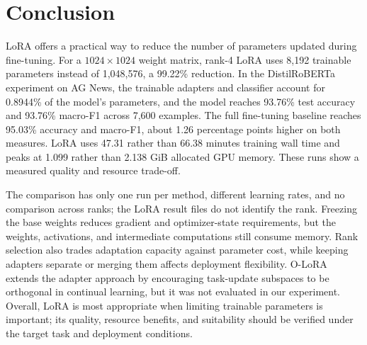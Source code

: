 \section{Conclusion}
LoRA offers a practical way to reduce the number of parameters updated
during fine-tuning. For a $1024 \times 1024$ weight matrix, rank-4 LoRA
uses 8,192 trainable parameters instead of 1,048,576, a 99.22\%
reduction. In the DistilRoBERTa experiment on AG News, the
trainable adapters and classifier account for 0.8944\% of the model's
parameters, and the model reaches 93.76\% test accuracy and 93.76\%
macro-F1 across 7,600 examples. The full fine-tuning baseline reaches
95.03\% accuracy and macro-F1, about 1.26 percentage points higher on
both measures. LoRA uses 47.31 rather than 66.38 minutes training wall
time and peaks at 1.099 rather than 2.138 GiB allocated GPU memory.
These runs show a measured quality and resource trade-off.

The comparison has only one run per method, different learning rates,
and no comparison across ranks; the LoRA result files do not identify
the rank.
Freezing the base weights reduces gradient and optimizer-state
requirements, but the weights, activations, and intermediate
computations still consume memory. Rank selection also trades
adaptation capacity against parameter cost, while keeping adapters
separate or merging them affects deployment flexibility. O-LoRA
extends the adapter approach by encouraging task-update subspaces to
be orthogonal in continual learning, but it was not evaluated in our
experiment. Overall, LoRA is most appropriate when limiting trainable
parameters is important; its quality, resource benefits, and
suitability should be verified under the target task and deployment
conditions.
